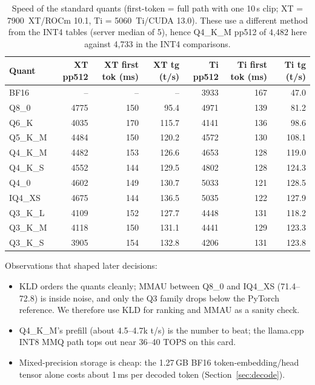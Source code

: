 \documentclass[10pt,a4paper]{article}
\newcommand{\tx}[1]{\texttt{\detokenize{#1}}}
\begin{document}
\begin{table}[H]
\centering\small
\caption{Speed of the standard quants (first-token = full \tx{llama-server} path with one 10\,s clip; XT = 7900~XT/ROCm 10.1,
Ti = 5060~Ti/CUDA 13.0). These use a different method from the INT4 tables (server median of 5), hence Q4\_K\_M pp512 of 4{,}482
here against 4{,}733 in the INT4 comparisons.}
\label{tab:quantspeed}
\begin{tabular}{@{}lrrrrrr@{}}
\toprule
Quant & XT pp512 & XT first tok (ms) & XT tg (t/s) & Ti pp512 & Ti first tok (ms) & Ti tg (t/s)\\
\midrule
BF16 & -- & -- & -- & 3933 & 167 & 47.0\\
Q8\_0 & 4775 & 150 & 95.4 & 4971 & 139 & 81.2\\
Q6\_K & 4035 & 170 & 115.7 & 4141 & 136 & 98.6\\
Q5\_K\_M & 4484 & 150 & 120.2 & 4572 & 130 & 108.1\\
Q4\_K\_M & 4482 & 153 & 126.6 & 4653 & 128 & 119.0\\
Q4\_K\_S & 4552 & 144 & 129.5 & 4802 & 128 & 124.3\\
Q4\_0 & 4602 & 149 & 130.7 & 5033 & 121 & 128.5\\
IQ4\_XS & 4675 & 144 & 136.5 & 5035 & 122 & 127.9\\
Q3\_K\_L & 4109 & 152 & 127.7 & 4448 & 131 & 118.2\\
Q3\_K\_M & 4118 & 150 & 131.1 & 4441 & 129 & 123.3\\
Q3\_K\_S & 3905 & 154 & 132.8 & 4206 & 131 & 123.8\\
\bottomrule
\end{tabular}
\end{table}

Observations that shaped later decisions:
\begin{itemize}
\item KLD orders the quants cleanly; MMAU between Q8\_0 and IQ4\_XS (71.4--72.8) is inside noise, and only the Q3 family drops
      below the PyTorch reference. We therefore use KLD for ranking and MMAU as a sanity check.
\item Q4\_K\_M's prefill (about 4.5--4.7k t/s) is the number to beat; the llama.cpp INT8 MMQ path tops out near
      36--40 TOPS on this card.
\item Mixed-precision storage is cheap: the 1.27\,GB BF16 token-embedding/head tensor alone costs about 1\,ms per decoded
      token (Section~\ref{sec:decode}).
\end{itemize}
\end{document}
